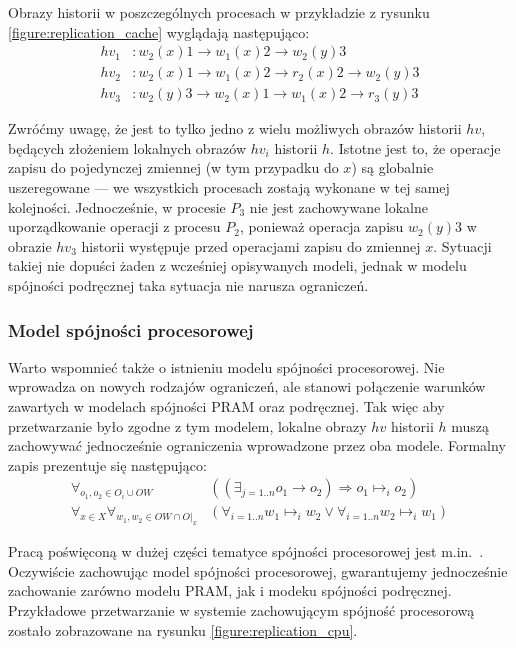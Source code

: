 Obrazy historii w poszczególnych procesach w przykładzie z rysunku \ref{figure:replication_cache} wyglądają następująco:
\begin{align*}
    hv_1&: w_2(x)1 \rightarrow w_1(x)2 \rightarrow w_2(y)3 \\
    hv_2&: w_2(x)1 \rightarrow w_1(x)2 \rightarrow r_2(x)2 \rightarrow w_2(y)3 \\
    hv_3&: w_2(y)3 \rightarrow w_2(x)1 \rightarrow w_1(x)2 \rightarrow r_3(y)3
\end{align*}

Zwróćmy uwagę, że jest to tylko jedno z wielu możliwych obrazów historii $ hv $, będących złożeniem lokalnych obrazów $ hv_i $ historii $ h $. Istotne jest to, że operacje zapisu do pojedynczej zmiennej (w tym przypadku do $ x $) są globalnie uszeregowane --- we wszystkich procesach zostają wykonane w tej samej kolejności. Jednocześnie, w procesie $ P_3 $ nie jest zachowywane lokalne uporządkowanie operacji z procesu $ P_2 $, ponieważ operacja zapisu $ w_2(y)3 $ w obrazie $ hv_3 $ historii występuje przed operacjami zapisu do zmiennej $ x $. Sytuacji takiej nie dopuści żaden z wcześniej opisywanych modeli, jednak w modelu spójności podręcznej taka sytuacja nie narusza ograniczeń.

\subsubsection{Model spójności procesorowej}

Warto wspomnieć także o istnieniu modelu spójności procesorowej. Nie wprowadza on nowych rodzajów ograniczeń, ale stanowi połączenie warunków zawartych w modelach spójności PRAM oraz podręcznej. Tak więc aby przetwarzanie było zgodne z tym modelem, lokalne obrazy $ hv$ historii $ h $ muszą zachowywać jednocześnie ograniczenia wprowadzone przez oba modele. Formalny zapis prezentuje się następująco:
\begin{align*}
    \forall_{o_1, o_2 \in O_i \cup OW} &((\exists_{j=1..n} o_1 \rightarrow o_2) \Rightarrow o_1 \mapsto_i o_2) \\
    \forall_{x \in X} \forall_{w_1, w_2 \in OW \cap O|_x} &(\forall_{i=1..n} w_1 \mapsto_i w_2 \vee \forall_{i=1..n} w_2 \mapsto_i w_1)
\end{align*}

Pracą poświęconą w dużej części tematyce spójności procesorowej jest m.in.\ \cite{ahamad:93}. Oczywiście zachowując model spójności procesorowej, gwarantujemy jednocześnie zachowanie zarówno modelu PRAM, jak i modeku spójności podręcznej. Przykładowe przetwarzanie w systemie zachowującym spójność procesorową zostało zobrazowane na rysunku \ref{figure:replication_cpu}.

